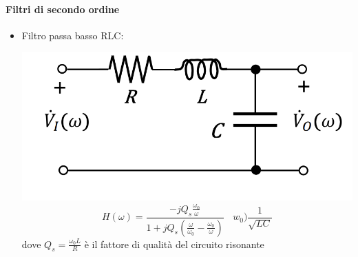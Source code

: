 \documentclass{article}
\theoremstyle{definition}
\begin{document}
\paragraph{Filtri di secondo ordine}
\begin{itemize}
	\item Filtro passa basso RLC:
	\begin{center}
\includegraphics[scale=0.50]{immagini/pbRLC}
$$H(\omega)=\frac{-jQ_s\frac{\omega_0}{\omega}}{1+jQ_s\left(\frac{\omega}{\omega_0}-\frac{\omega_0}{\omega}\right) }\ \ \ \ w_0)\frac{1}{\sqrt{LC}}$$
dove $Q_s=\frac{\omega_0 L}{R}$ è il fattore di qualità del circuito risonante
	\end{center}


\end{itemize}
\end{document}
